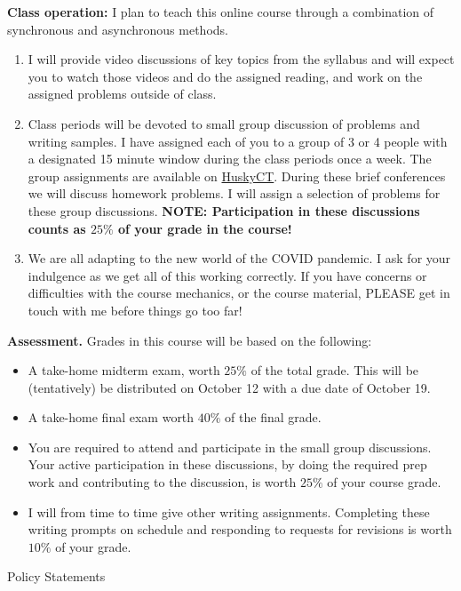 \documentclass[12pt]{article}
\begin{document}
{\bf Class operation:} I plan to teach this online course through a combination of synchronous and asynchronous
methods.
\begin{enumerate}
  \item I will provide video discussions of key topics from the syllabus and will expect you to watch those
    videos and do the assigned reading, and work on the assigned problems outside of class.
  \item Class periods will be devoted to small group discussion of problems
    and writing samples.  I have assigned each of you to a group of 3 or 4 people with a designated
    15 minute window during the class periods once a week.  The group assignments are available
    on \href{http://huckyct.uconn.edu}{HuskyCT}.  During these brief conferences we will discuss
    homework problems.  I will assign a selection of problems for these group discussions.
    {\bf NOTE: Participation in these discussions counts as $25\%$ of your grade in the course!}
  \item We are all adapting to the new world of the COVID pandemic.  I ask for your indulgence
    as we get all of this working correctly.  If you have concerns or difficulties with the course
    mechanics, or the course material, PLEASE get in touch with me before things go too far!
\end{enumerate}

{\bf Assessment.}  Grades in this course will be based on the
following:
\begin{itemize}
\item A take-home midterm exam,  worth $25\%$ of the total grade.  This will be (tentatively)
  be distributed on October 12 with a due date of October 19.
\item A take-home final exam worth $40\%$ of the final grade.
\item You are required to attend and participate in the small group discussions.  Your active participation
  in these discussions, by doing the required prep work and contributing to the discussion, is worth
  $25\%$ of your course grade.
\item I will from time to time give other writing assignments. Completing these writing prompts on schedule
  and responding to requests for revisions is worth $10\%$ of your grade.
\end{itemize}



\begin{center}

{\Large Policy Statements}

\end{center}
\end{document}

